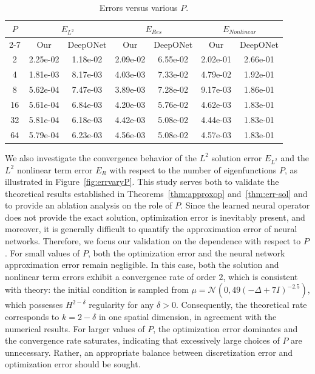 \documentclass[preprint,12pt]{elsarticle}
\theoremstyle{plain}
\numberwithin{figure}{section}
\numberwithin{table}{section}
\newcommand{\jdall}[1]{{\color{black}#1}}
\begin{document}
\begin{table}[!htbp]
	\centering
	\caption{Errors versus various $P$.}
	\begin{tabular}{c| c c|cc|cc}
		\hline
		\multirow{2}{*}{$P$} & \multicolumn{2}{c}{$E_{L^2}$} & \multicolumn{2}{c}{$E_{Res}$} & \multicolumn{2}{c}{$E_{Nonlinear}$ }\\
		\cline{2-7}
		& Our & DeepONet& Our & DeepONet& Our & DeepONet\\
		\hline
		2&2.25e-02 &1.18e-02&2.09e-02 &6.55e-02&2.02e-01&2.66e-01\\
		4&1.81e-03&8.17e-03&4.03e-03&7.33e-02&4.79e-02&1.92e-01\\
		8& 5.62e-04&7.47e-03&3.89e-03&7.28e-02& 9.17e-03&1.86e-01\\
		16&5.61e-04&6.84e-03&4.20e-03&5.76e-02&4.62e-03&1.83e-01\\
		32&5.81e-04&6.18e-03&4.42e-03&5.08e-02& 4.44e-03&1.83e-01\\
		64& 5.79e-04&6.23e-03&4.56e-03&5.08e-02&4.57e-03&1.83e-01\\
		\hline
	\end{tabular}
	
	\label{tab:kpp-variousp}
\end{table}

\jdall{We also investigate the convergence behavior of the $L^2$ solution error $E_{L^2}$ and the $L^2$ nonlinear term error $E_R$ with respect to the number of eigenfunctions $P$, as illustrated in Figure~\ref{fig:errvaryP}. This study serves both to validate the theoretical results established in Theorems~\ref{thm:approxop} and~\ref{thm:err-sol} and to provide an ablation analysis on the role of $P$. Since the learned neural operator does not provide the exact solution, optimization error is inevitably present, and moreover, it is generally difficult to quantify the approximation error of neural networks. Therefore, we focus our validation on the dependence with respect to $P$. For small values of $P$, both the optimization error and the neural network approximation error remain negligible. In this case, both the solution and nonlinear term errors exhibit a convergence rate of order $2$, which is consistent with theory: the initial condition is sampled from $\mu=\mathcal{N}(0,49(-\Delta+7I)^{-2.5})$, which possesses $H^{2-\delta}$ regularity for any $\delta>0$. Consequently, the theoretical rate corresponds to $k=2-\delta$ in one spatial dimension, in agreement with the numerical results. For larger values of $P$, the optimization error dominates and the convergence rate saturates, indicating that excessively large choices of $P$ are unnecessary. Rather, an appropriate balance between discretization error and optimization error should be sought.
}
\end{document}
